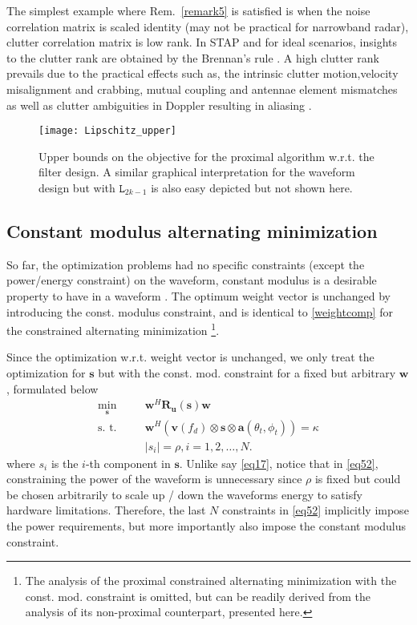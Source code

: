 \documentclass[11pt,draftclsnofoot,onecolumn]{IEEEtran}
\theoremstyle{definition}
\theoremstyle{remark}
\begin{document}
The simplest example where Rem.~\ref{remark5} is satisfied is when the noise correlation matrix is scaled identity (may not be practical for narrowband radar), clutter correlation matrix is low rank. In STAP and for ideal scenarios, insights to the clutter rank are obtained by the Brennan's rule \cite{guerci2003,klemm2002,ward1994}. A high clutter rank prevails due to the practical effects such as, the intrinsic clutter motion,velocity misalignment and crabbing, mutual coupling and antennae element mismatches as well as clutter ambiguities in Doppler resulting in aliasing \cite{ward1994}. 

\begin{figure} [tbp!]
\centering
\texttt{[image: Lipschitz\_upper]}
\caption{Upper bounds on the objective for the proximal algorithm w.r.t. the filter design. A similar graphical interpretation for the waveform design but with $\mathtt{L}_{2k-1}$ is also easy depicted but not shown here.}
\label{fig3}
\end{figure}
\subsection{Constant modulus alternating minimization}
So far, the optimization problems had no specific constraints (except the power/energy constraint) on the waveform, constant modulus is a desirable property to have in a waveform \cite{Setlurradar2014}. The optimum weight vector is unchanged by introducing the const. modulus constraint, and is identical to \eqref{weightcomp} for the constrained alternating minimization \footnote{The analysis of the proximal constrained alternating minimization with the const. mod. constraint is omitted, but can be readily derived from the analysis of its non-proximal counterpart, presented here.}.

Since the optimization w.r.t. weight vector is unchanged, we only treat the optimization for $\mathbf{s}$ but with the const. mod. constraint for a fixed but arbitrary $\mathbf{w}$, formulated below
\begin{align}
\min\limits_{\mathbf{s}} \;\;\;\;\; &\mathbf{w}^H\mathbf{R_u}(\mathbf{s})\mathbf{w} \nonumber \\
\mbox{s. t. }\;\;\;\;\; & \mathbf{w}^H(\mathbf{v}(f_d)\otimes\mathbf{s}\otimes\mathbf{a}(\theta_t,\phi_t))=\kappa  \label{eq52} \\ 
\;\;\;\;\;\; & |s_i|=\rho,i=1,2,\ldots,N. \nonumber \nonumber
\end{align}
 where $s_i$ is the $i$-th component in $\mathbf{s}$. Unlike say \eqref{eq17}, notice that in \eqref{eq52}, constraining  the power of the waveform is unnecessary since $\rho$ is fixed but could be chosen arbitrarily to scale up / down the waveforms energy to satisfy hardware limitations. Therefore, the last $N$ constraints in \eqref{eq52} implicitly impose the power requirements, but more importantly also impose the constant modulus constraint.
\end{document}
